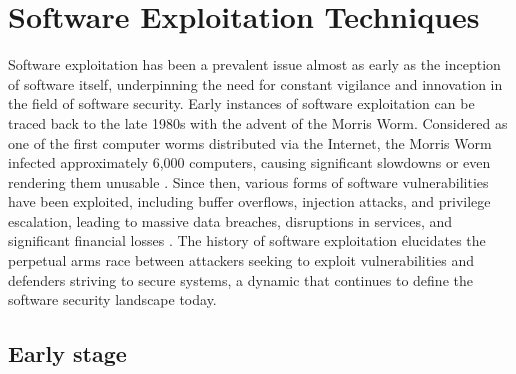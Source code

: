 \documentclass{article}
\begin{document}

\section{Software Exploitation Techniques}%
Software exploitation has been a prevalent issue almost as early as the
inception of software itself, underpinning the need for constant vigilance and
innovation in the field of software security. Early instances of software
exploitation can be traced back to the late 1980s with the advent of the Morris
Worm. Considered as one of the first computer worms distributed via the
Internet, the Morris Worm infected approximately 6,000 computers, causing
significant slowdowns or even rendering them unusable
\cite{spafford1989internet}. Since then, various forms of software
vulnerabilities have been exploited, including buffer overflows, injection
attacks, and privilege escalation, leading to massive data breaches, disruptions
in services, and significant financial losses \cite{owasp2017}. The history of
software exploitation elucidates the perpetual arms race between attackers
seeking to exploit vulnerabilities and defenders striving to secure systems, a
dynamic that continues to define the software security landscape today.

\subsection{Early stage}
\end{document}
